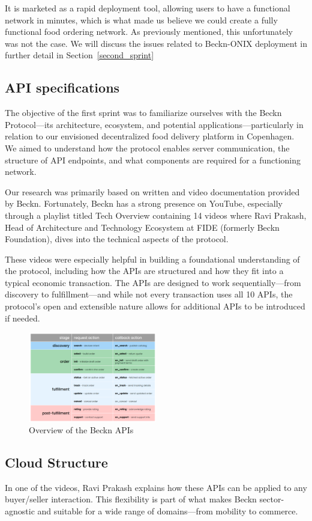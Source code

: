It is marketed as a rapid deployment tool, allowing users to have a functional network in minutes, which is what made us believe we could create a fully functional food ordering network. As previously mentioned, this unfortunately was not the case. We will discuss the issues related to Beckn-ONIX deployment in further detail in Section~\ref{second_sprint}
\subsection{API specifications}
The objective of the first sprint was to familiarize ourselves with the Beckn Protocol—its architecture, ecosystem, and potential applications—particularly in relation to our envisioned decentralized food delivery platform in Copenhagen. We aimed to understand how the protocol enables server communication, the structure of API endpoints, and what components are required for a functioning network.

Our research was primarily based on written and video documentation provided by Beckn. Fortunately, Beckn has a strong presence on YouTube, especially through a playlist titled Tech Overview containing 14 videos where Ravi Prakash, Head of Architecture and Technology Ecosystem at FIDE (formerly Beckn Foundation), dives into the technical aspects of the protocol.

These videos were especially helpful in building a foundational understanding of the protocol, including how the APIs are structured and how they fit into a typical economic transaction. The APIs are designed to work sequentially—from discovery to fulfillment—and while not every transaction uses all 10 APIs, the protocol’s open and extensible nature allows for additional APIs to be introduced if needed.

\begin{figure}[h]
\centering
\includegraphics[width=0.5\textwidth]{Images/beck_api_overview.png}
\caption{Overview of the Beckn APIs}
\label{fig:beckn_api_overview}
\end{figure}
\subsection{Cloud Structure}
In one of the videos, Ravi Prakash explains how these APIs can be applied to any buyer/seller interaction. This flexibility is part of what makes Beckn sector-agnostic and suitable for a wide range of domains—from mobility to commerce.

